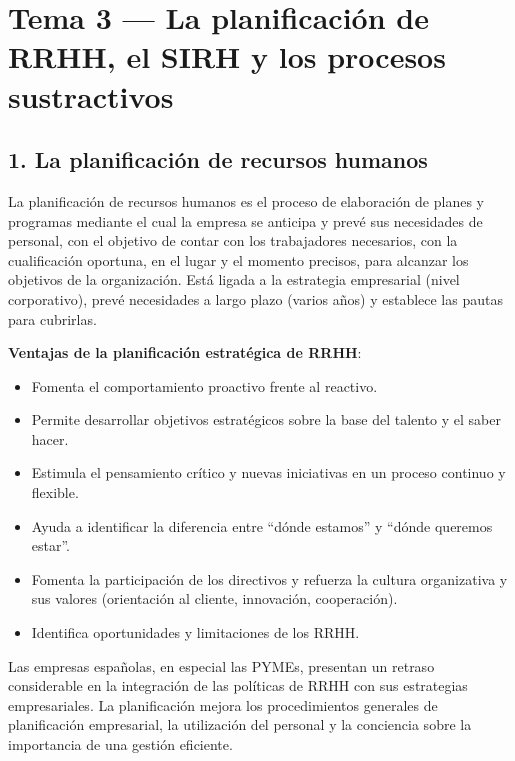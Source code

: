 \documentclass[12pt]{book} %
\providecommand{\tightlist}{%
  \setlength{\itemsep}{0pt}\setlength{\parskip}{0pt}}
\begin{document}
\hypertarget{tema-3-la-planificaciuxf3n-de-rrhh-el-sirh-y-los-procesos-sustractivos}{%
\chapter{Tema 3 --- La planificación de RRHH, el SIRH y los procesos
sustractivos}\label{tema-3-la-planificaciuxf3n-de-rrhh-el-sirh-y-los-procesos-sustractivos}}

\hypertarget{la-planificaciuxf3n-de-recursos-humanos}{%
\section{1. La planificación de recursos
humanos}\label{la-planificaciuxf3n-de-recursos-humanos}}

La planificación de recursos humanos es el proceso de elaboración de
planes y programas mediante el cual la empresa se anticipa y prevé sus
necesidades de personal, con el objetivo de contar con los trabajadores
necesarios, con la cualificación oportuna, en el lugar y el momento
precisos, para alcanzar los objetivos de la organización. Está ligada a
la estrategia empresarial (nivel corporativo), prevé necesidades a largo
plazo (varios años) y establece las pautas para cubrirlas.

\textbf{Ventajas de la planificación estratégica de RRHH}:

\begin{itemize}
\tightlist
\item
  Fomenta el comportamiento proactivo frente al reactivo.
\item
  Permite desarrollar objetivos estratégicos sobre la base del talento y
  el saber hacer.
\item
  Estimula el pensamiento crítico y nuevas iniciativas en un proceso
  continuo y flexible.
\item
  Ayuda a identificar la diferencia entre ``dónde estamos'' y ``dónde
  queremos estar''.
\item
  Fomenta la participación de los directivos y refuerza la cultura
  organizativa y sus valores (orientación al cliente, innovación,
  cooperación).
\item
  Identifica oportunidades y limitaciones de los RRHH.
\end{itemize}

Las empresas españolas, en especial las PYMEs, presentan un retraso
considerable en la integración de las políticas de RRHH con sus
estrategias empresariales. La planificación mejora los procedimientos
generales de planificación empresarial, la utilización del personal y la
conciencia sobre la importancia de una gestión eficiente.
\end{document}
